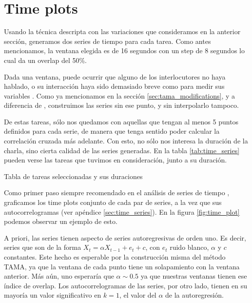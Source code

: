 \section{Time plots}

Usando la técnica descripta con las variaciones que consideramos en la anterior sección, generamos dos series de tiempo para cada tarea. Como antes mencionamos, la ventana elegida es de 16 segundos con un step de 8 segundos lo cual da un overlap del 50\%.

Dada una ventana, puede ocurrir que alguno de los interlocutores no haya hablado, o su interacción haya sido demasiado breve como para medir sus variables \ap. Como ya mencionamos en la sección \ref{sec:tama_modifications}, y a diferencia de \cite{KOU2008.2}, construimos las series sin ese punto, y sin interpolarlo tampoco.

De estas tareas, sólo nos quedamos con aquellas que tengan al menos 5 puntos definidos para cada serie, de manera que tenga sentido poder calcular la correlación cruzada más adelante. Con esto, no sólo nos interesa la duración de la charla, sino cierta calidad de las series generadas. En la tabla \ref{tab:time_series} pueden verse las tareas que tuvimos en consideración, junto a su duración.

\begin{table}
\centering

\caption{Tabla de tareas seleccionadas y sus duraciones}
\label{tab:time_series}
\end{table}


Como primer paso siempre recomendado en el análisis de series de tiempo \cite{CHATFIELD}, graficamos los time plots conjunto de cada par de series, a la vez que sus autocorrelogramas (ver apéndice \ref{sec:time_series}). En la figura \ref{fig:time_plot} podemos observar un ejemplo de esto.

A priori, las series tienen aspecto de series autoregresivas de orden uno. Es decir, series que son de la forma $X_t = \alpha X_{t-1} + e_t + c$, con $e_t$ ruido blanco, $\alpha$ y $c$ constantes. Este hecho es esperable  por la construcción misma del método TAMA, ya que la ventana de cada punto tiene un solapamiento con la ventana anterior. Más aún, uno esperaría que $\alpha \sim 0.5$ ya que nuestras ventanas tienen ese índice de overlap. Los autocorrelogramas de las series, por otro lado, tienen en su mayoría un valor significativo en $k = 1$, el valor del $\alpha$ de la autoregresión.


